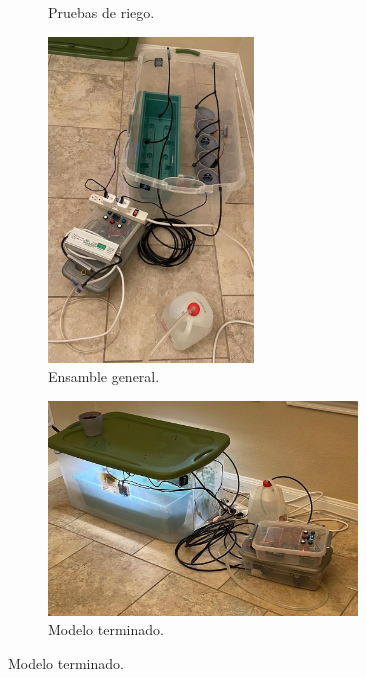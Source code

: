 \begin{figure}[!htpb]
\begin{subfigure}[b]{0.45\textwidth}
		\caption{Pruebas de riego.}
		\label{fig:gh2}
     \end{subfigure}
     \hfill	
	 \begin{subfigure}[b]{0.45\textwidth}
		\centering
		\includegraphics[width=0.60\textwidth]{./Figures/chapter4/Invernadero3.jpg}
		\caption{Ensamble general.}
		\label{fig:gh3}
     \end{subfigure}
     \hfill
          \begin{subfigure}[b]{0.45\textwidth}
		\centering
		\includegraphics[width=0.90\textwidth]{./Figures/chapter4/Invernadero4.jpg}
		\caption{Modelo terminado.}
		\label{fig:gh4}
     \end{subfigure}

\end{figure}
